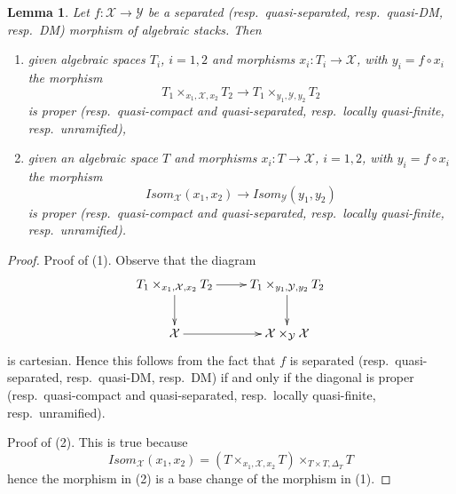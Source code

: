 \documentclass[10pt,a4paper]{amsart}
\theoremstyle{plain}
\newtheorem{lemma}[subsection]{Lemma}
\theoremstyle{definition}
\theoremstyle{remark}
\numberwithin{equation}{subsection}
\begin{document}
\begin{lemma}
\label{lemma-separated-implies-isom}
Let $f : \mathcal{X} \to \mathcal{Y}$ be a separated
(resp.\ quasi-separated, resp.\ quasi-DM, resp.\ DM)
morphism of algebraic stacks. Then
\begin{enumerate}
\item given algebraic spaces $T_i$, $i = 1, 2$ and morphisms
$x_i : T_i \to \mathcal{X}$, with $y_i = f \circ x_i$ the morphism
$$
T_1 \times_{x_1, \mathcal{X}, x_2} T_2 \longrightarrow
T_1 \times_{y_1, \mathcal{Y}, y_2} T_2
$$
is proper (resp.\ quasi-compact and quasi-separated,
resp.\ locally quasi-finite, resp.\ unramified),
\item given an algebraic space $T$ and morphisms
$x_i : T \to \mathcal{X}$, $i = 1, 2$, with $y_i = f \circ x_i$ the morphism
$$
\mathit{Isom}_\mathcal{X}(x_1, x_2) \longrightarrow
\mathit{Isom}_\mathcal{Y}(y_1, y_2)
$$
is proper (resp.\ quasi-compact and quasi-separated,
resp.\ locally quasi-finite, resp.\ unramified).
\end{enumerate}
\end{lemma}

\begin{proof}
Proof of (1). Observe that the diagram
$$
\xymatrix{
T_1 \times_{x_1, \mathcal{X}, x_2} T_2 \ar[d] \ar[r] &
T_1 \times_{y_1, \mathcal{Y}, y_2} T_2 \ar[d] \\
\mathcal{X} \ar[r] & \mathcal{X} \times_\mathcal{Y} \mathcal{X}
}
$$
is cartesian. Hence this follows from the fact that $f$ is separated
(resp.\ quasi-separated, resp.\ quasi-DM, resp.\ DM)
if and only if the diagonal is proper
(resp.\ quasi-compact and quasi-separated,
resp.\ locally quasi-finite, resp.\ unramified).

\medskip\noindent
Proof of (2). This is true because
$$
\mathit{Isom}_\mathcal{X}(x_1, x_2) =
(T \times_{x_1, \mathcal{X}, x_2} T) \times_{T \times T, \Delta_T} T
$$
hence the morphism in (2) is a base change of the morphism in (1).
\end{proof}
\end{document}
